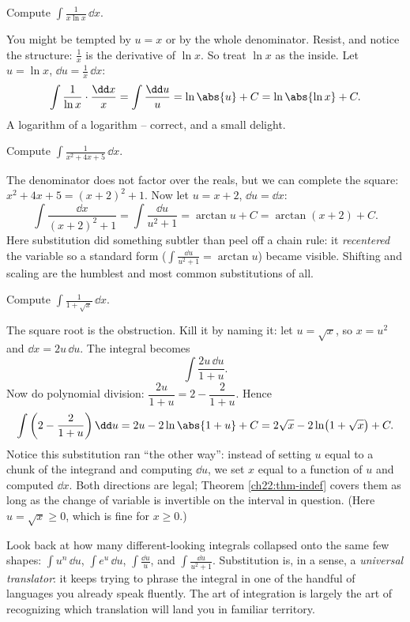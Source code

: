 \begin{example}
\label{ch22:ex-sneaky1}
Compute $\displaystyle \int \frac{1}{x\ln x}\,\dd x$.

You might be tempted by $u = x$ or by the whole denominator. Resist, and notice the
structure: $\tfrac1x$ is the derivative of $\ln x$. So treat $\ln x$ as the
inside. Let $u = \ln x$, $\dd u = \tfrac1x\,\dd x$:
\[
  \int \frac{1}{\ln x}\cdot\frac{\dd x}{x} = \int \frac{\dd u}{u}
   = \ln\abs{u} + C = \ln\abs{\ln x} + C.
\]
A logarithm of a logarithm -- correct, and a small delight.
\end{example}

\begin{example}
\label{ch22:ex-square}
Compute $\displaystyle \int \frac{1}{x^2+4x+5}\,\dd x$.

The denominator does not factor over the reals, but we can complete the square:
$x^2+4x+5 = (x+2)^2 + 1$. Now let $u = x+2$, $\dd u = \dd x$:
\[
  \int \frac{\dd x}{(x+2)^2+1} = \int \frac{\dd u}{u^2+1} = \arctan u + C
   = \arctan(x+2) + C.
\]
Here substitution did something subtler than peel off a chain rule: it
\emph{recentered} the variable so a standard form ($\int \frac{\dd u}{u^2+1} =
\arctan u$) became visible. Shifting and scaling are the humblest and most common
substitutions of all.
\end{example}

\begin{example}
\label{ch22:ex-rational}
Compute $\displaystyle \int \frac{1}{1+\sqrt{x}}\,\dd x$.

The square root is the obstruction. Kill it by naming it: let $u = \sqrt x$, so
$x = u^2$ and $\dd x = 2u\,\dd u$. The integral becomes
\[
  \int \frac{2u\,\dd u}{1+u}.
\]
Now do polynomial division: $\dfrac{2u}{1+u} = 2 - \dfrac{2}{1+u}$. Hence
\[
  \int\left(2 - \frac{2}{1+u}\right)\dd u = 2u - 2\ln\abs{1+u} + C
   = 2\sqrt x - 2\ln\!\big(1+\sqrt x\big) + C.
\]
Notice this substitution ran ``the other way'': instead of setting $u$ equal to a
chunk of the integrand and computing $\dd u$, we set $x$ equal to a function of $u$
and computed $\dd x$. Both directions are legal; Theorem \ref{ch22:thm-indef}
covers them as long as the change of variable is invertible on the interval in
question. (Here $u=\sqrt x \ge 0$, which is fine for $x \ge 0$.)
\end{example}

\begin{aestheticbox}
Look back at how many different-looking integrals collapsed onto the same few
shapes: $\int u^n\,\dd u$, $\int e^u\,\dd u$, $\int \frac{\dd u}{u}$, and $\int
\frac{\dd u}{u^2+1}$. Substitution is, in a sense, a \emph{universal translator}: it
keeps trying to phrase the integral in one of the handful of languages you already
speak fluently. The art of integration is largely the art of recognizing which
translation will land you in familiar territory.
\end{aestheticbox}

